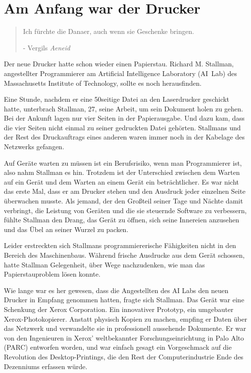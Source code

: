 \chapter{Am Anfang war der Drucker}

\begin{quotation}
Ich fürchte die Danaer, auch wenn sie Geschenke bringen.

- Vergils \textit{Aeneid}
\end{quotation}


Der neue Drucker hatte schon wieder einen Papierstau.
Richard M. Stallman, angestellter Programmierer am Artificial Intelligence Laboratory (AI~Lab) des Massachusetts Institute of Technology, sollte es noch herausfinden. 

Eine Stunde, nachdem er eine 50seitige Datei an den Laserdrucker geschickt hatte, unterbrach Stallman, 27, seine Arbeit, um sein Dokument holen zu gehen. Bei der Ankunft lagen nur vier Seiten in der Papierausgabe. Und dazu kam, dass die vier Seiten nicht einmal zu seiner gedruckten Datei gehörten. Stallmans und der Rest des Druckauftrags eines anderen waren immer noch in der Kabelage des Netzwerks gefangen.

Auf Geräte warten zu müssen ist ein Berufsrisiko, wenn man Programmierer ist, also nahm Stallman es hin. Trotzdem ist der Unterschied zwischen dem Warten auf ein Gerät und dem Warten an einem Gerät ein beträchtlicher. Es war nicht das erste Mal, dass er am Drucker stehen und den Ausdruck jeder einzelnen Seite überwachen musste. Als jemand, der den Großteil seiner Tage und Nächte damit verbringt, die Leistung von Geräten und die sie steuernde Software zu verbessern, fühlte Stallman den Drang, das Gerät zu öffnen, sich seine Innereien anzusehen und das Übel an seiner Wurzel zu packen.

Leider erstreckten sich Stallmans programmiererische Fähigkeiten nicht in den Bereich des Maschinenbaus. Während frische Ausdrucke aus dem Gerät schossen, hatte Stallman Gelegenheit, über Wege nachzudenken, wie man das Papierstauproblem lösen konnte. 

Wie lange war es her gewesen, dass die Angestellten des AI Labs den neuen Drucker in Empfang genommen hatten, fragte sich Stallman. Das Gerät war eine Schenkung der Xerox Corporation. Ein innovativer Prototyp, ein umgebauter Xerox-Photokopierer. Anstatt physisch Kopien zu machen, empfing er Daten über das Netzwerk und verwandelte sie in professionell aussehende Dokumente. Er war von den Ingenieuren in Xerox' weltbekannter Forschungseinrichtung in Palo Alto (PARC) entworfen worden, und war einfach gesagt ein Vorgeschmack auf die Revolution des Desktop-Printings, die den Rest der Computerindustrie Ende des Dezenniums erfassen würde.

